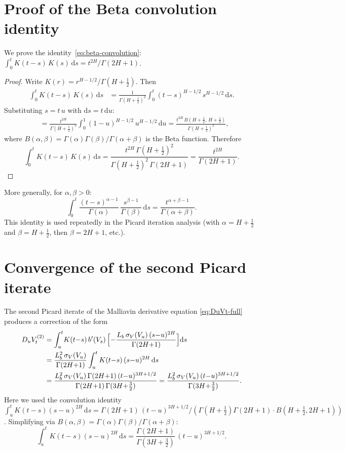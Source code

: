 \documentclass[12pt]{article}
\theoremstyle{definition}
\newcommand{\dd}{\mathrm{d}}
\begin{document}
\section{Proof of the Beta convolution identity}
\label{app:beta-convolution}

We prove the identity~\eqref{eq:beta-convolution}:
$\int_0^t K(t{-}s)\,K(s)\,\dd s = t^{2H}/\Gamma(2H{+}1)$.

\begin{proof}
Write $K(r) = r^{H-1/2}/\Gamma(H+\tfrac12)$.
Then
\begin{align*}
  \int_0^t K(t{-}s)\,K(s)\,\dd s
  &= \frac{1}{\Gamma(H+\tfrac12)^2}
  \int_0^t (t{-}s)^{H-1/2}\,s^{H-1/2}\,\dd s.
\end{align*}
Substituting $s = t\,u$ with $\dd s = t\,\dd u$:
\begin{align*}
  &= \frac{t^{2H}}{\Gamma(H+\tfrac12)^2}
  \int_0^1 (1{-}u)^{H-1/2}\,u^{H-1/2}\,\dd u
  = \frac{t^{2H}\,B(H{+}\tfrac12,\, H{+}\tfrac12)}
  {\Gamma(H+\tfrac12)^2},
\end{align*}
where $B(\alpha,\beta) = \Gamma(\alpha)\Gamma(\beta)/\Gamma(\alpha+\beta)$
is the Beta function.
Therefore
\[
  \int_0^t K(t{-}s)\,K(s)\,\dd s
  = \frac{t^{2H}\,\Gamma(H+\tfrac12)^2}
  {\Gamma(H+\tfrac12)^2\,\Gamma(2H{+}1)}
  = \frac{t^{2H}}{\Gamma(2H{+}1)}.
\]
\end{proof}

More generally, for $\alpha, \beta > 0$:
\begin{equation}\label{eq:general-convolution}
  \int_0^t \frac{(t{-}s)^{\alpha-1}}{\Gamma(\alpha)}\,
  \frac{s^{\beta-1}}{\Gamma(\beta)}\,\dd s
  = \frac{t^{\alpha+\beta-1}}{\Gamma(\alpha+\beta)}.
\end{equation}
This identity is used repeatedly in the Picard iteration analysis
(with $\alpha = H + \tfrac12$ and $\beta = H + \tfrac12$, then
$\beta = 2H + 1$, etc.).

\section{Convergence of the second Picard iterate}
\label{app:second-picard}

The second Picard iterate of the Malliavin derivative equation
\eqref{eq:DuVt-full} produces a correction of the form
\begin{align*}
  D_u V_t^{(2)}
  &= \int_u^t\! K(t{-}s)\,b'(V_s)\,
  \Bigl[-\frac{L_b\,\sigma_V(V_u)\,(s{-}u)^{2H}}{\Gamma(2H{+}1)}\Bigr]
  \dd s \\
  &= \frac{L_b^2\,\sigma_V(V_u)}{\Gamma(2H{+}1)}
  \int_u^t K(t{-}s)\,(s{-}u)^{2H}\,\dd s \\
  &= \frac{L_b^2\,\sigma_V(V_u)\,
  \Gamma(2H{+}1)\,(t{-}u)^{3H+1/2}}
  {\Gamma(2H{+}1)\,\Gamma(3H{+}\tfrac32)}
  = \frac{L_b^2\,\sigma_V(V_u)\,(t{-}u)^{3H+1/2}}
  {\Gamma(3H{+}\tfrac32)}.
\end{align*}
Here we used the convolution identity
$\int_u^t K(t{-}s)(s{-}u)^{2H}\,\dd s =
\Gamma(2H{+}1)\,(t{-}u)^{3H+1/2}/
(\Gamma(H{+}\tfrac12)\Gamma(2H{+}1)\cdot B(H{+}\tfrac12, 2H{+}1))$.
Simplifying via $B(\alpha,\beta) = \Gamma(\alpha)\Gamma(\beta)/
\Gamma(\alpha+\beta)$:
\[
  \int_u^t K(t{-}s)(s{-}u)^{2H}\,\dd s
  = \frac{\Gamma(2H{+}1)}{\Gamma(3H{+}\tfrac32)}\,(t{-}u)^{3H+1/2}.
\]
\end{document}

